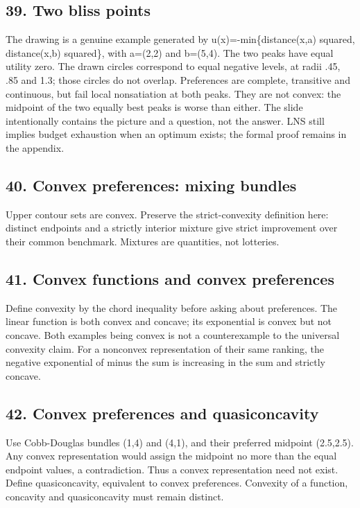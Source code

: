 \documentclass[11pt,a4paper]{article}
\begin{document}
\subsection*{39. Two bliss points}
The drawing is a genuine example generated by u(x)=-min\{distance(x,a) squared, distance(x,b) squared\}, with a=(2,2) and b=(5,4). The two peaks have equal utility zero. The drawn circles correspond to equal negative levels, at radii .45, .85 and 1.3; those circles do not overlap. Preferences are complete, transitive and continuous, but fail local nonsatiation at both peaks. They are not convex: the midpoint of the two equally best peaks is worse than either. The slide intentionally contains the picture and a question, not the answer. LNS still implies budget exhaustion when an optimum exists; the formal proof remains in the appendix.

\subsection*{40. Convex preferences: mixing bundles}
Upper contour sets are convex. Preserve the strict-convexity definition here: distinct endpoints and a strictly interior mixture give strict improvement over their common benchmark. Mixtures are quantities, not lotteries.

\subsection*{41. Convex functions and convex preferences}
Define convexity by the chord inequality before asking about preferences. The linear function is both convex and concave; its exponential is convex but not concave. Both examples being convex is not a counterexample to the universal convexity claim. For a nonconvex representation of their same ranking, the negative exponential of minus the sum is increasing in the sum and strictly concave.

\subsection*{42. Convex preferences and quasiconcavity}
Use Cobb-Douglas bundles (1,4) and (4,1), and their preferred midpoint (2.5,2.5). Any convex representation would assign the midpoint no more than the equal endpoint values, a contradiction. Thus a convex representation need not exist. Define quasiconcavity, equivalent to convex preferences. Convexity of a function, concavity and quasiconcavity must remain distinct.
\end{document}
